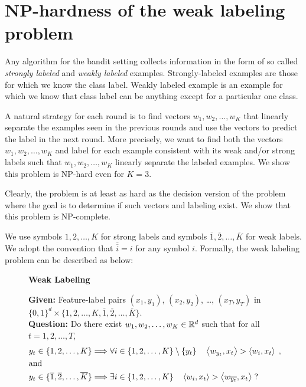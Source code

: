 \section{NP-hardness of the weak labeling problem}
\label{section:np-hardness-of-weak-labeling-problem}

Any algorithm for the bandit setting collects information in the form of so
called \emph{strongly labeled} and \emph{weakly labeled} examples.
Strongly-labeled examples are those for which we know the class label. Weakly
labeled example is an example for which we know that class label can be anything
except for a particular one class.

A natural strategy for each round is to find vectors $w_1, w_2, \dots, w_K$ that
linearly separate the examples seen in the previous rounds and use the vectors
to predict the label in the next round. More precisely, we want to find both the
vectors $w_1, w_2, \dots, w_K$ and label for each example consistent with its
weak and/or strong labels such that $w_1, w_2, \dots, w_K$ linearly separate the
labeled examples. We show this problem is NP-hard even for $K=3$.

Clearly, the problem is at least as hard as the decision version of the problem
where the goal is to determine if such vectors and labeling exist. We show that
this problem is NP-complete.

We use symbols $1,2,\dots,K$ for strong labels and symbols $\overline{1},
\overline{2}, \dots, \overline{K}$ for weak labels. We adopt the convention that
$\overline{\overline{i}} = i$ for any symbol $i$. Formally, the weak
labeling problem can be described as below:
\begin{figure}[H]
\begin{framed}
\begin{center}
    \textbf{Weak Labeling}
\end{center}
\textbf{Given:} Feature-label pairs $(x_1, y_1)$, $(x_2, y_2)$, \dots, $(x_T, y_T)$ in $\{0,1\}^d \times \{1,2,\dots, K, \overline{1}, \overline{2}, \dots, \overline{K}\}$. \\
\textbf{Question:} Do there exist $ w_1, w_2, \dots, w_K \in \mathbb{R}^d$ such that for all $t=1,2,\dots,T$,
\begin{align*}
& y_t \in \{1,2,\dots,K\} \Longrightarrow \forall i \in \{1,2,\dots,K\} \setminus \{y_t\} \quad \left\langle w_{y_t}, x_t \right\rangle  > \left\langle w_i, x_t \right\rangle \; , \\
& \text{and} \\
& y_t \in \{\overline{1}, \overline{2},\dots, \overline{K}\} \Longrightarrow \exists i \in \{1,2,\dots,K\} \quad \left\langle w_i, x_t \right\rangle > \left\langle w_{\overline{y_t}}, x_t \right\rangle \; ?
\end{align*}
\end{framed}
\end{figure}


